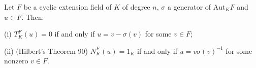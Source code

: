 Let $F$ be a cyclic extension field of $K$ of degree $n$, $\sigma$ a generator of $\mathrm{Aut}_K F$ and $u \in F$. Then:

(i) $T_K^F(u) = 0$ if and only if $u = v - \sigma(v)$ for some $v \in F$;

(ii) (Hilbert's Theorem 90) $N_K^F(u) = 1_K$ if and only if $u = v\sigma(v)^{-1}$ for some nonzero $v \in F$.
